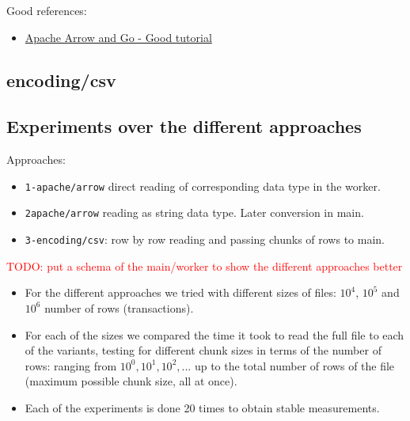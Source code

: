 \documentclass{article}
\begin{document}
Good references:
\begin{itemize}
  \item \href{https://www.apachecon.com/acna2022/slides/01_Topol_Arrow_and_Go.pdf}{Apache Arrow and Go - Good tutorial}
\end{itemize}


\subsection{encoding/csv}

\subsection{Experiments over the different approaches}

Approaches:
\begin{itemize}
  \item \texttt{1-apache/arrow} direct reading of corresponding data type in the worker.
  \item \texttt{2apache/arrow} reading as string data type. Later conversion in main.
  \item \texttt{3-encoding/csv}: row by row reading and passing chunks of rows to main.
\end{itemize}

\textcolor{red}{TODO: put a schema of the main/worker to show the different approaches better}

\begin{itemize}
  \item For the different approaches we tried with different sizes of files: $10^4$, $10^5$ and $10^6$ number of rows (transactions).
  \item For each of the sizes we compared the time it took to read the full file to each of the variants, testing for different chunk sizes in terms of the number of rows: ranging from $10^0, 10^1, 10^2,...$ up to the total number of rows of the file (maximum possible chunk size, all at once).
  \item Each of the experiments is done 20 times to obtain stable measurements.
\end{itemize}
\end{document}
